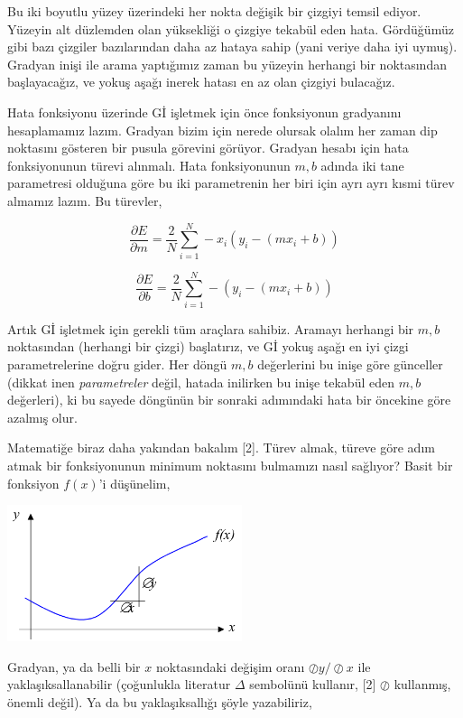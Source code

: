 \documentclass[12pt,fleqn]{article}\usepackage{../../common}
\begin{document}
Bu iki boyutlu yüzey üzerindeki her nokta değişik bir çizgiyi temsil
ediyor. Yüzeyin alt düzlemden olan yüksekliği o çizgiye tekabül eden
hata. Gördüğümüz gibi bazı çizgiler bazılarından daha az hataya sahip (yani
veriye daha iyi uymuş). Gradyan inişi ile arama yaptığımız zaman bu yüzeyin
herhangi bir noktasından başlayacağız, ve yokuş aşağı inerek hatası en az olan
çizgiyi bulacağız.

Hata fonksiyonu üzerinde Gİ işletmek için önce fonksiyonun gradyanını
hesaplamamız lazım. Gradyan bizim için nerede olursak olalım her zaman dip
noktasını gösteren bir pusula görevini görüyor. Gradyan hesabı için hata
fonksiyonunun türevi alınmalı. Hata fonksiyonunun $m,b$ adında iki tane
parametresi olduğuna göre bu iki parametrenin her biri için ayrı ayrı kısmi
türev almamız lazım. Bu türevler,

$$ 
\frac{\partial E}{\partial m} =
\frac{2}{N} \sum _{i=1}^{N} -x_i (y_i - (mx_i+b))
$$

$$ 
\frac{\partial E}{\partial b} =
\frac{2}{N} \sum _{i=1}^{N} -(y_i - (mx_i+b))
$$

Artık Gİ işletmek için gerekli tüm araçlara sahibiz. Aramayı herhangi bir $m,b$
noktasından (herhangi bir çizgi) başlatırız, ve Gİ yokuş aşağı en iyi çizgi
parametrelerine doğru gider. Her döngü $m,b$ değerlerini bu inişe göre günceller
(dikkat inen {\em parametreler} değil, hatada inilirken bu inişe tekabül eden
$m,b$ değerleri), ki bu sayede döngünün bir sonraki adımındaki hata bir öncekine
göre azalmış olur.

Matematiğe biraz daha yakından bakalım [2]. Türev almak, türeve göre adım atmak
bir fonksiyonunun minimum noktasını bulmamızı nasıl sağlıyor? Basit bir
fonksiyon $f(x)$'i düşünelim, 

\includegraphics[height=4cm]{vision_90fitting_05.png}

Gradyan, ya da belli bir $x$ noktasındaki değişim oranı $\oslash y / \oslash x$
ile yaklaşıksallanabilir (çoğunlukla literatur $\Delta$ sembolünü kullanır, [2]
$\oslash$ kullanmış, önemli değil). Ya da bu yaklaşıksallığı şöyle yazabiliriz,
\end{document}
